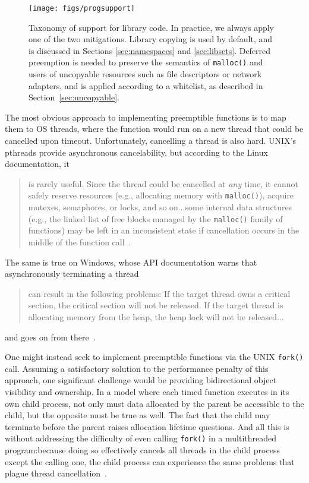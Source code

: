 \begin{figure}
\texttt{[image: figs/progsupport]}
\caption{Taxonomy of support for library code.  \textnormal{In practice, we always
apply one of the two mitigations.  Library copying is used by default, and is
discussed in Sections \ref{sec:namespaces} and \ref{sec:libsets}.  Deferred
preemption is needed to preserve the semantics of \texttt{malloc()} and users of
uncopyable resources such as file descriptors or network adapters, and is applied
according to a whitelist, as described in Section~\ref{sec:uncopyable}.}}
\label{fig:progsupport}
\end{figure}

The most obvious approach to implementing preemptible functions is to map them to
OS threads, where the function would run on a new thread that
could be cancelled upon timeout.  Unfortunately, cancelling a thread is also hard.
UNIX's pthreads provide
asynchronous cancelability, but according to the Linux documentation, it
\begin{quote}
is rarely
useful.  Since the thread could be cancelled at \textit{any} time, it cannot safely
reserve resources (e.g., allocating memory with \texttt{malloc()}), acquire mutexes,
semaphores, or locks, and so on...\@ some internal data structures (e.g., the linked
list of free blocks managed by the \texttt{malloc()} family of functions) may be left
in an inconsistent state if cancellation occurs in the middle of the function
call~\cite{pthreadsetcanceltype-manpage}.
\end{quote}
The same is true on Windows, whose API
documentation warns that asynchronously terminating a thread
\begin{quote}
can result in the
following problems: If the target thread owns a critical section, the critical
section will not be released.  If the target thread is allocating memory from the
heap, the heap lock will not be released...
\end{quote}
and goes on from
there~\cite{www-microsoft-terminatethread}.

One might instead seek to implement preemptible functions via the UNIX
\texttt{fork()} call.  Assuming a satisfactory solution to the performance penalty
of this approach, one significant challenge would be providing bidirectional object
visibility and ownership.  In a model where each timed function executes in its own
child process, not only must data allocated by the parent be accessible to the child,
but the opposite must be true as well.  The fact that the child may terminate before
the parent raises allocation lifetime questions.  And all this is
without addressing the difficulty of even calling \texttt{fork()} in a multithreaded
program:\@ because doing so effectively cancels all threads in the child process
except the calling one, the child process can experience the same problems that
plague thread cancellation~\cite{baumann:hotos2019}.


